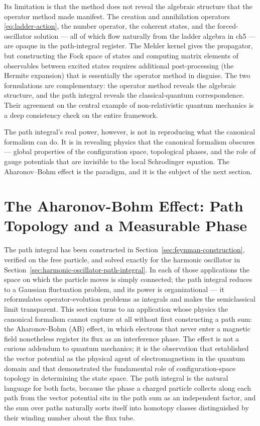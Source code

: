 Its limitation is that the method does not reveal the algebraic structure that the operator method made manifest. The creation and annihilation operators \eqref{eq:ladder-action}, the number operator, the coherent states, and the forced-oscillator solution --- all of which flow naturally from the ladder algebra in ch5 --- are opaque in the path-integral register. The Mehler kernel gives the propagator, but constructing the Fock space of states and computing matrix elements of observables between excited states requires additional post-processing (the Hermite expansion) that is essentially the operator method in disguise. The two formulations are complementary: the operator method reveals the algebraic structure, and the path integral reveals the classical-quantum correspondence. Their agreement on the central example of non-relativistic quantum mechanics is a deep consistency check on the entire framework.

The path integral's real power, however, is not in reproducing what the canonical formalism can do. It is in revealing physics that the canonical formalism obscures --- global properties of the configuration space, topological phases, and the role of gauge potentials that are invisible to the local Schrodinger equation. The Aharonov--Bohm effect is the paradigm, and it is the subject of the next section.


\section{The Aharonov-Bohm Effect: Path Topology and a Measurable Phase}
\label{sec:aharonov-bohm}

The path integral has been constructed in Section~\ref{sec:feynman-construction}, verified on the free particle, and solved exactly for the harmonic oscillator in Section~\ref{sec:harmonic-oscillator-path-integral}. In each of those applications the space on which the particle moves is simply connected; the path integral reduces to a Gaussian fluctuation problem, and its power is organizational --- it reformulates operator-evolution problems as integrals and makes the semiclassical limit transparent. This section turns to an application whose physics the canonical formalism cannot capture at all without first constructing a path sum: the Aharonov-Bohm (AB) effect, in which electrons that never enter a magnetic field nonetheless register its flux as an interference phase. The effect is not a curious addendum to quantum mechanics; it is the observation that established the vector potential as the physical agent of electromagnetism in the quantum domain and that demonstrated the fundamental role of configuration-space topology in determining the state space. The path integral is the natural language for both facts, because the phase a charged particle collects along each path from the vector potential sits in the path sum as an independent factor, and the sum over paths naturally sorts itself into homotopy classes distinguished by their winding number about the flux tube.

